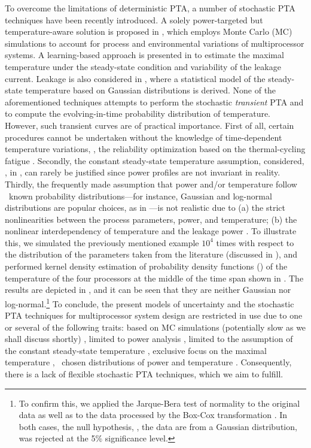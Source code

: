 To overcome the limitations of deterministic PTA, a number of stochastic PTA techniques have been recently introduced. A solely power-targeted but temperature-aware solution is proposed in \cite{chandra2010}, which employs Monte Carlo (MC) simulations to account for process and environmental variations of multiprocessor systems. A learning-based approach is presented in \cite{juan2011} to estimate the maximal temperature under the steady-state condition and variability of the leakage current. Leakage is also considered in \cite{juan2012}, where a statistical model of the steady-state temperature based on Gaussian distributions is derived. None of the aforementioned techniques attempts to perform the stochastic \emph{transient} PTA and to compute the evolving-in-time probability distribution of temperature. However, such transient curves are of practical importance. First of all, certain procedures cannot be undertaken without the knowledge of time-dependent temperature variations, \eg, the reliability optimization based on the thermal-cycling fatigue \cite{ukhov2012}. Secondly, the constant steady-state temperature assumption, considered, \eg, in \cite{juan2011, juan2012}, can rarely be justified since power profiles are not invariant in reality. Thirdly, the frequently made assumption that power and/or temperature follow \apriori\ known probability distributions---for instance, Gaussian and log-normal distributions are popular choices, as in \cite{juan2012, srivastava2010}---is not realistic due to (a) the strict nonlinearities between the process parameters, power, and temperature; (b) the nonlinear interdependency of temperature and the leakage power \cite{liu2007}. To illustrate this, we simulated the previously mentioned example $10^4$ times with respect to the distribution of the parameters taken from the literature (discussed in ), and performed kernel density estimation of probability density functions (\pdfs) of the temperature of the four processors at the middle of the time span shown in . The results are depicted in , and it can be seen that they are neither Gaussian nor log-normal.\footnote{To confirm this, we applied the Jarque-Bera test \cite{juan2012} of normality to the original data as well as to the data processed by the Box-Cox transformation \cite{juan2012}. In both cases, the null hypothesis, \ie, the data are from a Gaussian distribution, was rejected at the 5\% significance level.} To conclude, the present models of uncertainty and the stochastic PTA techniques for multiprocessor system design are restricted in use due to one or several of the following traits: based on MC simulations (potentially slow as we shall discuss shortly) \cite{chandra2010}, limited to power analysis \cite{chandra2010}, limited to the assumption of the constant steady-state temperature \cite{juan2011, juan2012}, exclusive focus on the maximal temperature \cite{juan2011}, \apriori\ chosen distributions of power and temperature \cite{juan2012, srivastava2010}. Consequently, there is a lack of flexible stochastic PTA techniques, which we aim to fulfill.

